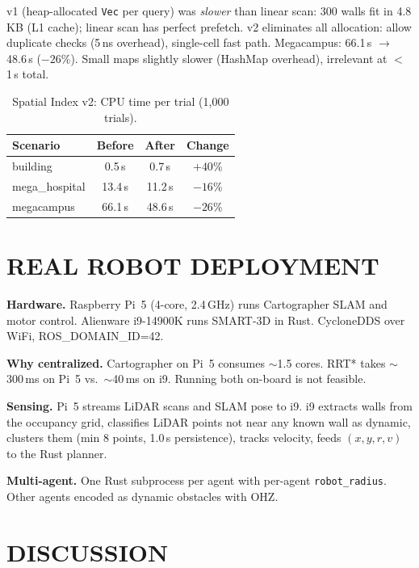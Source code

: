 \documentclass[letterpaper, 10pt, conference]{IEEEtran}
\newcommand{\smarttd}{SMART\nobreakdash-3D}
\begin{document}
v1 (heap-allocated \texttt{Vec} per query) was \emph{slower} than linear scan: 300 walls fit in 4.8\,KB (L1 cache); linear scan has perfect prefetch. v2 eliminates all allocation: allow duplicate checks (5\,ns overhead), single-cell fast path. Megacampus: 66.1\,s $\to$ 48.6\,s ($-26$\%). Small maps slightly slower (HashMap overhead), irrelevant at $<$1\,s total.

\begin{table}[t]
\centering
\caption{Spatial Index v2: CPU time per trial (1{,}000 trials).}
\label{tab:spatial}
\begin{tabular}{lccc}
\toprule
Scenario & Before & After & Change \\
\midrule
building       & 0.5\,s & 0.7\,s & $+40$\% \\
mega\_hospital & 13.4\,s & 11.2\,s & $-16$\% \\
megacampus     & 66.1\,s & 48.6\,s & $-26$\% \\
\bottomrule
\end{tabular}
\end{table}

\section{REAL ROBOT DEPLOYMENT}
\label{sec:deployment}

\textbf{Hardware.} Raspberry Pi~5 (4-core, 2.4\,GHz) runs Cartographer SLAM and motor control. Alienware i9-14900K runs \smarttd{} in Rust. CycloneDDS over WiFi, ROS\_DOMAIN\_ID=42.

\textbf{Why centralized.} Cartographer on Pi~5 consumes ${\sim}$1.5 cores. RRT* takes ${\sim}$300\,ms on Pi~5 vs.\ ${\sim}$40\,ms on i9. Running both on-board is not feasible.

\textbf{Sensing.} Pi~5 streams LiDAR scans and SLAM pose to i9. i9 extracts walls from the occupancy grid, classifies LiDAR points not near any known wall as dynamic, clusters them (min 8 points, 1.0\,s persistence), tracks velocity, feeds $(x, y, r, v)$ to the Rust planner.

\textbf{Multi-agent.} One Rust subprocess per agent with per-agent \texttt{robot\_radius}. Other agents encoded as dynamic obstacles with OHZ.

\section{DISCUSSION}
\end{document}
